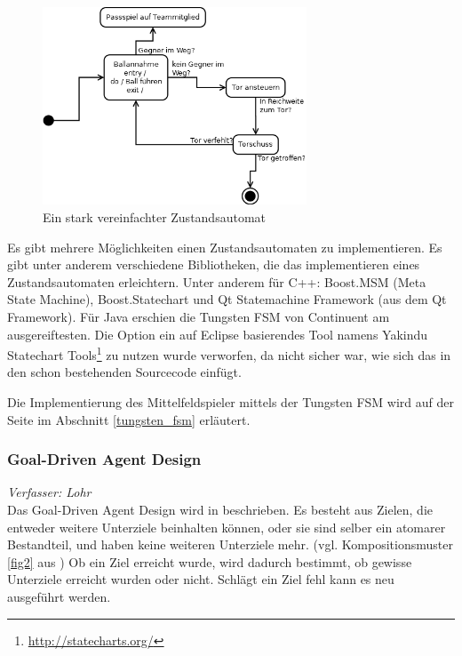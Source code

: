 \documentclass[fontsize=12pt,a4paper,final]{scrartcl}[2003/01/01]
\begin{document}
\begin{figure}[ht]
	\centering
  \includegraphics[width=0.7\textwidth]{Grafiken/KI/Bsp-Zustandsdiagramm.png}
	\caption{Ein stark vereinfachter Zustandsautomat}
	\label{fig1}
\end{figure}

Es gibt mehrere Möglichkeiten einen Zustandsautomaten zu implementieren. Es gibt unter anderem verschiedene Bibliotheken, die das implementieren eines Zustandsautomaten erleichtern. Unter anderem für C++: Boost.MSM (Meta State Machine), Boost.Statechart und Qt Statemachine Framework (aus dem Qt Framework). Für Java erschien die Tungsten FSM von Continuent am ausgereiftesten. Die Option ein auf Eclipse basierendes Tool namens Yakindu Statechart Tools\footnote{\url{http://statecharts.org/}} zu nutzen wurde verworfen, da nicht sicher war, wie sich das in den schon bestehenden Sourcecode einfügt.\par Die  Implementierung des Mittelfeldspieler mittels der Tungsten FSM wird auf der Seite \pageref{tungsten_fsm} im Abschnitt \ref{tungsten_fsm} erläutert.

\subsubsection{Goal-Driven Agent Design}
\textit{Verfasser: Lohr}\\
Das Goal-Driven Agent Design wird in \cite[S. 379 ff.]{buckland2005programming} beschrieben. Es besteht aus Zielen, die entweder weitere Unterziele beinhalten können, oder sie sind selber ein atomarer Bestandteil, und haben keine weiteren Unterziele mehr. (vgl. Kompositionsmuster \ref{fig2} aus \cite{gamma1994design}) Ob ein Ziel erreicht wurde, wird dadurch bestimmt, ob gewisse Unterziele erreicht wurden oder nicht. Schlägt ein Ziel fehl kann es neu ausgeführt werden.
\end{document}
